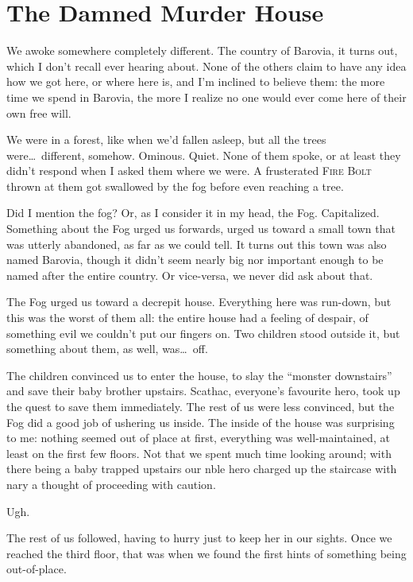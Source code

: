 
\section*{The Damned Murder House}
We awoke somewhere completely different. The country of Barovia, it turns out, which I don't recall ever hearing about. None of the others claim to have any idea how we got here, or where here is, and I'm inclined to believe them: the more time we spend in Barovia, the more I realize no one would ever come here of their own free will.

We were in a forest, like when we'd fallen asleep, but all the trees were\dots\ different, somehow. Ominous. Quiet. None of them spoke, or at least they didn't respond when I asked them where we were. A frusterated \textsc{Fire Bolt} thrown at them got swallowed by the fog before even reaching a tree.

Did I mention the fog? Or, as I consider it in my head, the Fog. Capitalized. Something about the Fog urged us forwards, urged us toward a small town that was utterly abandoned, as far as we could tell. It turns out this town was also named Barovia, though it didn't seem nearly big nor important enough to be named after the entire country. Or vice-versa, we never did ask about that.

The Fog urged us toward a decrepit house. Everything here was run-down, but this was the worst of them all: the entire house had a feeling of despair, of something evil we couldn't put our fingers on. Two children stood outside it, but something about them, as well, was\dots\ off.

The children convinced us to enter the house, to slay the ``monster downstairs'' and save their baby brother upstairs. Scathac, everyone's favourite hero, took up the quest to save them immediately. The rest of us were less convinced, but the Fog did a good job of ushering us inside. The inside of the house was surprising to me: nothing seemed out of place at first, everything was well-maintained, at least on the first few floors. Not that we spent much time looking around; with there being a baby trapped upstairs our nble hero charged up the staircase with nary a thought of proceeding with caution.

Ugh.

The rest of us followed, having to hurry just to keep her in our sights. Once we reached the third floor, that was when we found the first hints of something being out-of-place.

